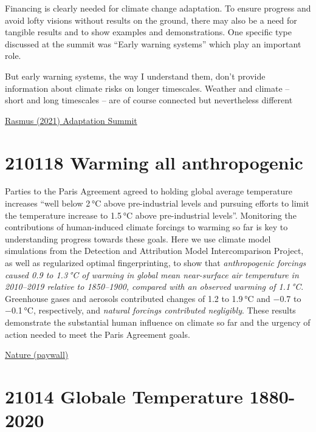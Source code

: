 \documentclass[
]{book}
\begin{document}
Financing is clearly needed for climate change adaptation. To ensure progress and avoid lofty visions without results on the ground, there may also be a need for tangible results and to show examples and demonstrations. One specific type discussed at the summit was ``Early warning systems'' which play an important role.

But early warning systems, the way I understand them, don't provide information about climate risks on longer timescales. Weather and climate -- short and long timescales -- are of course connected but nevertheless different

\href{http://www.realclimate.org/index.php/archives/2021/01/climate-adaptation-summit-2021/}{Rasmus (2021) Adaptation Summit}

\hypertarget{warming-all-anthropogenic}{%
\section{210118 Warming all anthropogenic}\label{warming-all-anthropogenic}}

Parties to the Paris Agreement agreed to holding global average temperature increases ``well below 2 °C above pre-industrial levels and pursuing efforts to limit the temperature increase to 1.5 °C above pre-industrial levels''. Monitoring the contributions of human-induced climate forcings to warming so far is key to understanding progress towards these goals. Here we use climate model simulations from the Detection and Attribution Model Intercomparison Project, as well as regularized optimal fingerprinting, to show that \emph{anthropogenic forcings caused 0.9 to 1.3 °C of warming in global mean near-surface air temperature in 2010--2019 relative to 1850--1900, compared with an observed warming of 1.1 °C}. Greenhouse gases and aerosols contributed changes of 1.2 to 1.9 °C and −0.7 to −0.1 °C, respectively, and \emph{natural forcings contributed negligibly}. These results demonstrate the substantial human influence on climate so far and the urgency of action needed to meet the Paris Agreement goals.

\href{https://www.nature.com/articles/s41558-020-00965-9}{Nature (paywall)}

\hypertarget{globale-temperature-1880-2020}{%
\section{21014 Globale Temperature 1880-2020}\label{globale-temperature-1880-2020}}
\end{document}
